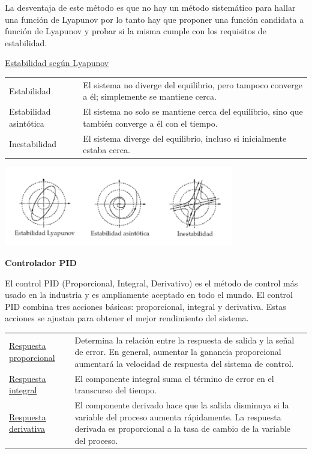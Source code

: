 \documentclass[fleqn,letterpaper,12pt]{article}
\begin{document}
La desventaja de este método es que no hay un método sistemático para hallar una función de Lyapunov por lo tanto hay que proponer una función candidata a función de Lyapunov y probar si la misma cumple con los requisitos de estabilidad.

\vspace{9mm}

\uline{Estabilidad según Lyapunov}

\vspace{4mm}

\raggedright
\begin{tabular}{l p{12cm}} %
    Estabilidad & El sistema no diverge del equilibrio, pero tampoco converge a él; simplemente se mantiene cerca. \\
    Estabilidad asintótica & El sistema no solo se mantiene cerca del equilibrio, sino que también converge a él con el tiempo. \\
    Inestabilidad & El sistema diverge del equilibrio, incluso si inicialmente estaba cerca. \\
\end{tabular}
\justifying

\includegraphics[width=0.75\textwidth]{inestabilidades.jpeg}

\textbf{Controlador PID}

El control PID (Proporcional, Integral, Derivativo) es el método de control más usado en la industria y es ampliamente aceptado en todo el mundo. El control PID combina tres acciones básicas: proporcional, integral y derivativa. Estas acciones se ajustan para obtener el mejor rendimiento del sistema.

\vspace{1mm}

\raggedright
\begin{tabular}{l p{11.6cm}} %
    \uline{Respuesta proporcional} & Determina la relación entre la respuesta de salida y la señal de error. En general, aumentar la ganancia proporcional aumentará la velocidad de respuesta del sistema de control. \\
    \uline{Respuesta integral} & El componente integral suma el término de error en el transcurso del tiempo.  \\
    \uline{Respuesta derivativa} & El componente derivado hace que la salida disminuya si la variable del proceso aumenta rápidamente. La respuesta derivada es proporcional a la tasa de cambio de la variable del proceso.  \\
\end{tabular}
\justifying
\end{document}
